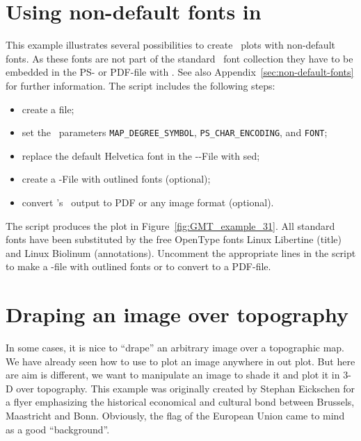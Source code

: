 
\section{Using non-default fonts in \PS}
\label{sec:non-default-fonts-example}

This example illustrates several possibilities to create \GMT\
plots with non-default fonts. As these fonts are not part of the
standard \PS\ font collection they have to be embedded in the PS-
or PDF-file with \progname{Ghostscript}. See also
Appendix~\ref{sec:non-default-fonts} for further information. The
script includes the following steps:

\begin{itemize}
\item create a  file;
\item set the \GMT\ parameters \verb#MAP_DEGREE_SYMBOL#,
  \verb#PS_CHAR_ENCODING#, and \verb#FONT#;
\item replace the default Helvetica font in the \GMT-\PS-File with
  sed;
\item create a \PS-File with outlined fonts (optional);
\item convert \GMT's \PS\ output to PDF or any image format
  (optional).
\end{itemize}


The script produces the plot in
Figure~\ref{fig:GMT_example_31}. All standard fonts have been
substituted by the free OpenType fonts Linux Libertine (title) and
Linux Biolinum (annotations). Uncomment the appropriate lines in
the script to make a \PS-file with outlined fonts or to convert to
a PDF-file.

 

\section{Draping an image over topography}

In some cases, it is nice to ``drape'' an arbitrary image over a topographic map.
We have already seen how to use \GMTprog{psimage} to plot an image anywhere in out plot.
But here are aim is different, we want to manipulate an image to shade it and plot it in 3-D over topography.
This example was originally created by Stephan Eickschen for a flyer emphasizing the historical economical and cultural
bond between Brussels, Maastricht and Bonn. Obviously, the flag of the European Union came to mind as a good
``background''.

